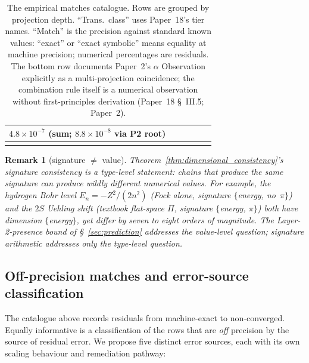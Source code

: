 \documentclass[11pt]{article}
\newtheorem{remark}{Remark}
\begin{document}
\begin{longtable}{p{3.5cm} p{2.8cm} p{1.3cm} p{2.2cm} p{1.8cm} p{1.4cm}}
$4.8\!\times\!10^{-7}$ (sum; $8.8\!\times\!10^{-8}$ via P2 root) \\
\bottomrule
\caption{The empirical matches catalogue.  Rows are grouped by
projection depth.  ``Trans.\ class'' uses Paper~18's tier names.
``Match'' is the precision against standard known values:
``exact'' or ``exact symbolic'' means equality at machine
precision; numerical percentages are residuals.  The bottom row
documents Paper~2's $\alpha$ Observation explicitly as a
multi-projection coincidence; the combination rule itself is a
numerical observation without first-principles derivation
(Paper~18 \S~III.5; Paper~2).}
\label{tab:catalog}
\end{longtable}

\begin{remark}[signature $\ne$ value]
\label{rem:signature_value}
Theorem~\ref{thm:dimensional_consistency}'s signature consistency is
a type-level statement: chains that produce the same signature can
produce wildly different numerical values.  For example, the
hydrogen Bohr level $E_n = -Z^2/(2n^2)$ (Fock alone, signature
$\{$energy, no~$\pi\}$) and the $2S$ Uehling shift (textbook flat-space $\Pi$, signature
$\{$energy, $\pi\}$) both have dimension
$\{$energy$\}$, yet differ by seven to eight orders of magnitude.  The Layer-2-presence bound of
\S~\ref{sec:prediction} addresses the value-level question;
signature arithmetic addresses only the type-level question.
\end{remark}

\subsection{Off-precision matches and error-source classification}
\label{sec:offprecision}

The catalogue above records residuals from machine-exact to
non-converged.  Equally informative is a classification of the rows
that are \emph{off} precision by the source of residual error.  We propose five distinct error sources, each with
its own scaling behaviour and remediation pathway:
\end{document}
